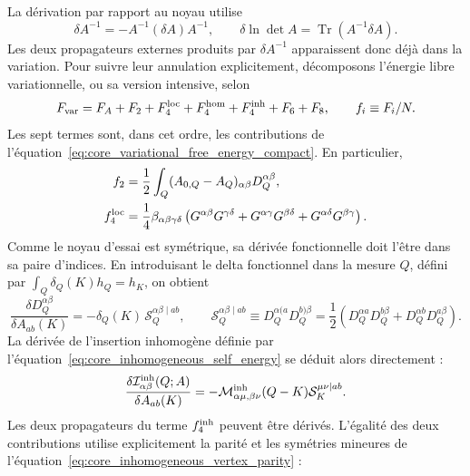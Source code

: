 La dérivation par rapport au noyau utilise
\begin{equation}
\delta A^{-1}=-A^{-1}(\delta A)A^{-1},
\qquad
\delta\ln\det A=\operatorname{Tr}(A^{-1}\delta A).
\label{eq:core_matrix_variations}
\end{equation}
Les deux propagateurs externes produits par
$\delta A^{-1}$ apparaissent donc déjà dans la variation. Pour suivre leur
annulation explicitement, décomposons l'énergie libre variationnelle, ou sa
version intensive, selon
\begin{equation}
F_{\rm var}=F_A+F_2+F_4^{\rm loc}+F_4^{\rm hom}
+F_4^{\rm inh}+F_6+F_8,
\qquad f_i\equiv F_i/N .
\label{eq:core_variational_decomposition}
\end{equation}
Les sept termes sont, dans cet ordre, les contributions de
l'équation~\eqref{eq:core_variational_free_energy_compact}. En particulier,
\begin{align}
f_2&=\frac12\int_Q(A_{0,Q}-A_Q)_{\alpha\beta}D_Q^{\alpha\beta},
\label{eq:core_f2_definition}\\
f_4^{\rm loc}&=\frac14\beta_{\alpha\beta\gamma\delta}
\left(G^{\alpha\beta}G^{\gamma\delta}
+G^{\alpha\gamma}G^{\beta\delta}
+G^{\alpha\delta}G^{\beta\gamma}\right).
\label{eq:core_f4loc_definition}
\end{align}
Comme le noyau d'essai est symétrique, sa dérivée fonctionnelle doit l'être
dans sa paire d'indices. En introduisant le delta fonctionnel dans la mesure
$Q$, défini par $\int_Q\delta_Q(K)h_Q=h_K$, on obtient
\begin{equation}
\frac{\delta D_Q^{\alpha\beta}}{\delta A_{ab}(K)}
=-\delta_Q(K)\,\mathcal S_Q^{\alpha\beta\mid ab},
\qquad
\mathcal S_Q^{\alpha\beta\mid ab}
\equiv D_Q^{\alpha(a}D_Q^{b)\beta}
=\frac12\left(D_Q^{\alpha a}D_Q^{b\beta}
+D_Q^{\alpha b}D_Q^{a\beta}\right).
\label{eq:core_symmetric_propagator_derivative}
\end{equation}
La dérivée de l'insertion inhomogène définie par
l'équation~\eqref{eq:core_inhomogeneous_self_energy} se déduit alors directement :
\begin{equation}
\frac{\delta\mathcal I^{\rm inh}_{\alpha\beta}(Q;A)}
{\delta A_{ab}(K)}
=-\mathcal M^{\rm inh}_{\alpha\mu,\beta\nu}(Q-K)
\mathcal S_K^{\mu\nu\mid ab}.
\label{eq:core_inhomogeneous_self_energy_derivative}
\end{equation}
Les deux propagateurs du terme $f_4^{\rm inh}$ peuvent être dérivés. L'égalité
des deux contributions utilise explicitement la parité et les symétries
mineures de l'équation~\eqref{eq:core_inhomogeneous_vertex_parity} :
